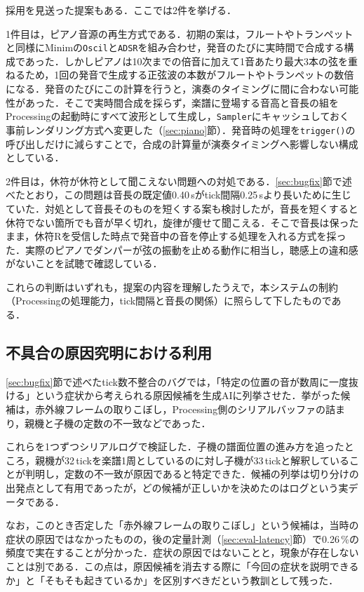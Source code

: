\documentclass[uplatex,dvipdfmx]{jlreq}
\begin{document}
採用を見送った提案もある．ここでは2件を挙げる．

1件目は，ピアノ音源の再生方式である．初期の案は，フルートやトランペットと同様にMinimの\texttt{Oscil}と\texttt{ADSR}を組み合わせ，発音のたびに実時間で合成する構成であった．しかしピアノは10次までの倍音に加えて1音あたり最大3本の弦を重ねるため，1回の発音で生成する正弦波の本数がフルートやトランペットの数倍になる．発音のたびにこの計算を行うと，演奏のタイミングに間に合わない可能性があった．そこで実時間合成を採らず，楽譜に登場する音高と音長の組をProcessingの起動時にすべて波形として生成し，\texttt{Sampler}にキャッシュしておく事前レンダリング方式へ変更した（\ref{sec:piano}節）．発音時の処理を\texttt{trigger()}の呼び出しだけに減らすことで，合成の計算量が演奏タイミングへ影響しない構成としている．

2件目は，休符が休符として聞こえない問題への対処である．\ref{sec:bugfix}節で述べたとおり，この問題は音長の既定値0.40\,sがtick間隔0.25\,sより長いために生じていた．対処として音長そのものを短くする案も検討したが，音長を短くすると休符でない箇所でも音が早く切れ，旋律が痩せて聞こえる．そこで音長は保ったまま，休符Rを受信した時点で発音中の音を停止する処理を入れる方式を採った．実際のピアノでダンパーが弦の振動を止める動作に相当し，聴感上の違和感がないことを試聴で確認している．

これらの判断はいずれも，提案の内容を理解したうえで，本システムの制約（Processingの処理能力，tick間隔と音長の関係）に照らして下したものである．

\subsection{不具合の原因究明における利用}

\ref{sec:bugfix}節で述べたtick数不整合のバグでは，「特定の位置の音が数周に一度抜ける」という症状から考えられる原因候補を生成AIに列挙させた．挙がった候補は，赤外線フレームの取りこぼし，Processing側のシリアルバッファの詰まり，親機と子機の定数の不一致などであった．

これらを1つずつシリアルログで検証した．子機の譜面位置の進み方を追ったところ，親機が32\,tickを楽譜1周としているのに対し子機が33\,tickと解釈していることが判明し，定数の不一致が原因であると特定できた．候補の列挙は切り分けの出発点として有用であったが，どの候補が正しいかを決めたのはログという実データである．

なお，このとき否定した「赤外線フレームの取りこぼし」という候補は，当時の症状の原因ではなかったものの，後の定量計測（\ref{sec:eval-latency}節）で0.26\,\%の頻度で実在することが分かった．症状の原因ではないことと，現象が存在しないことは別である．この点は，原因候補を消去する際に「今回の症状を説明できるか」と「そもそも起きているか」を区別すべきだという教訓として残った．
\end{document}

